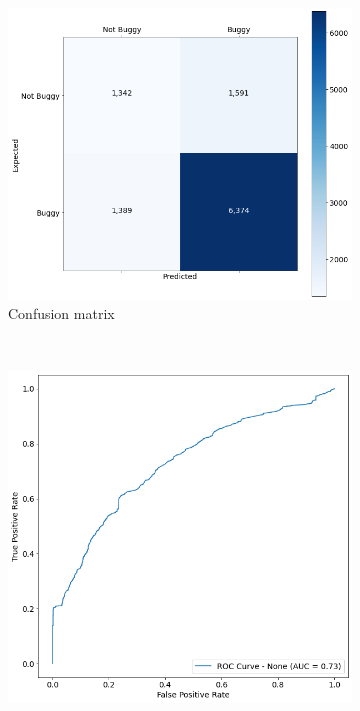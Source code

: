 \begin{figure}[H]
	\begin{subfigure}{\textwidth}
		\centering
		\includegraphics[scale=0.3]{./src/methodBug/methodbug_onesidedselection_cm.png}
		\caption{Confusion matrix}\label{}
	\end{subfigure}\\
	\begin{subfigure}{.5\textwidth}
		\centering
		\includegraphics[scale=0.3]{./src/methodBug/methodbug_onesidedselection_roc.png}

\end{subfigure}
\end{figure}
